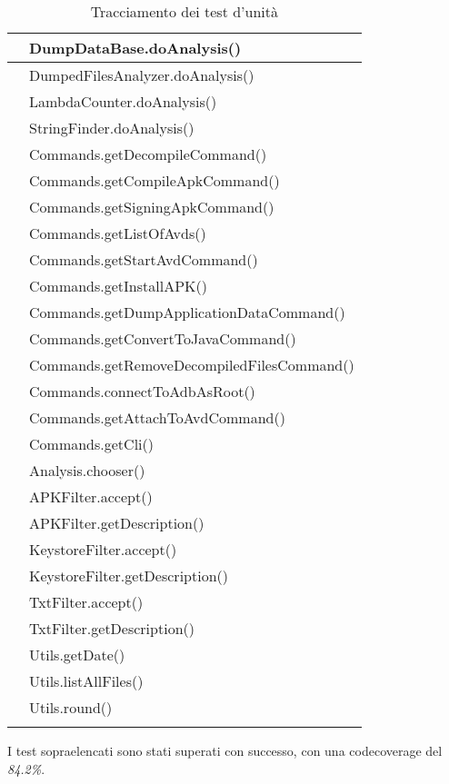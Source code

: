 \begin{center}
\begin{longtable}{ |C{3cm} |C{10.5cm}|}
         & DumpDataBase.doAnalysis()                  \\\hline
         & DumpedFilesAnalyzer.doAnalysis()           \\\hline
         & LambdaCounter.doAnalysis()                 \\\hline
         & StringFinder.doAnalysis()                  \\\hline
         & Commands.getDecompileCommand()             \\\hline
         & Commands.getCompileApkCommand()            \\\hline
         & Commands.getSigningApkCommand()            \\\hline
         & Commands.getListOfAvds()                   \\\hline
         & Commands.getStartAvdCommand()              \\\hline
         & Commands.getInstallAPK()                   \\\hline
         & Commands.getDumpApplicationDataCommand()   \\\hline
         & Commands.getConvertToJavaCommand()         \\\hline
         & Commands.getRemoveDecompiledFilesCommand() \\\hline
         & Commands.connectToAdbAsRoot()              \\\hline
         & Commands.getAttachToAvdCommand()           \\\hline
         & Commands.getCli()                          \\\hline
         & Analysis.chooser()                         \\\hline
         & APKFilter.accept()                         \\\hline
         & APKFilter.getDescription()                 \\\hline
         & KeystoreFilter.accept()                    \\\hline
         & KeystoreFilter.getDescription()            \\\hline
         & TxtFilter.accept()                         \\\hline
         & TxtFilter.getDescription()                 \\\hline
         & Utils.getDate()                            \\\hline
         & Utils.listAllFiles()                       \\\hline
         & Utils.round()                              \\\hline
        \caption{Tracciamento dei test d'unità}
    \end{longtable}
\end{center}

I test sopraelencati sono stati superati con successo, con una \gls{codecoverage} del \textit{84.2\%}.
